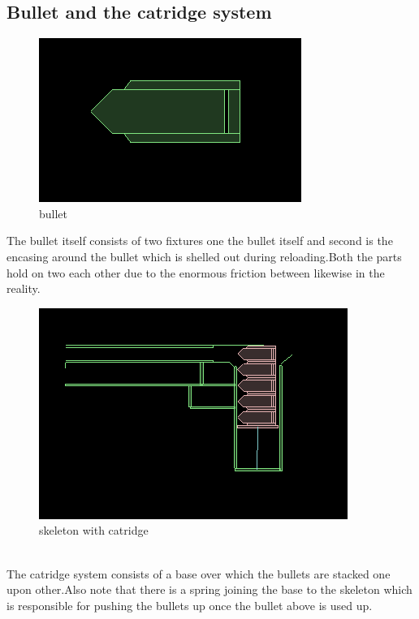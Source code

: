 \documentclass[11pt]{article}
\begin{document}
\subsection{Bullet and the catridge system}
\begin{figure}[here]
\begin{center}
\includegraphics[scale=0.3]{../details/images/bullet.png}
\caption{bullet}
\end{center}
\end{figure}
The bullet itself consists of two fixtures \cite{box2d}
one the bullet itself and second is the encasing around the bullet which is shelled out during reloading.Both the parts hold on two each other due to the enormous friction between likewise in the reality.\\
\begin{figure}[here]
\begin{center}\includegraphics[scale=0.3]{../details/images/bullets.png}
\caption{skeleton with catridge}
\end{center}
\end{figure}\\
The catridge system consists of a base over which the bullets are stacked one upon other.Also note that there is a spring joining the base to the skeleton which is responsible for pushing the bullets up once the bullet above is used up.
\end{document}
